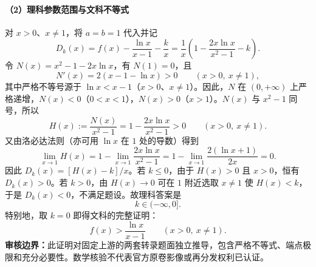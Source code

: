 \documentclass[UTF8,a4paper,10pt]{ctexart}
\begin{document}
\paragraph{（2）理科参数范围与文科不等式} 对 $x>0$、$x\ne1$，将 $a=b=1$ 代入并记
\[
D_k(x)=f(x)-\frac{\ln x}{x-1}-\frac{k}{x}
=\frac1x\left(1-\frac{2x\ln x}{x^2-1}-k\right).
\]
令 $N(x)=x^2-1-2x\ln x$，有 $N(1)=0$，且
\[
N'(x)=2(x-1-\ln x)>0\qquad (x>0,\ x\ne1),
\]
其中严格不等号源于 $\ln x<x-1$（$x>0$、$x\ne1$）。因此，$N$ 在 $(0,+\infty)$ 上严格递增，$N(x)<0$（$0<x<1$），$N(x)>0$（$x>1$）。$N(x)$ 与 $x^2-1$ 同号，所以
\[
H(x):=\frac{N(x)}{x^2-1}
=1-\frac{2x\ln x}{x^2-1}>0\qquad (x>0,\ x\ne1).
\]
又由洛必达法则（亦可用 $\ln x$ 在 $1$ 处的导数）得到
\[
\lim_{x\to1}H(x)=1-\lim_{x\to1}\frac{2x\ln x}{x^2-1}
=1-\lim_{x\to1}\frac{2(\ln x+1)}{2x}=0.
\]
因此 $D_k(x)=[H(x)-k]/x$。若 $k\le0$，由于 $H(x)>0$ 且 $x>0$，恒有 $D_k(x)>0$。若 $k>0$，由 $H(x)\to0$ 可在 $1$ 附近选取 $x\ne1$ 使 $H(x)<k$，于是 $D_k(x)<0$，不满足题设。故理科答案是
\[\boxed{k\in(-\infty,0]}.\]
特别地，取 $k=0$ 即得文科的完整证明：
\[\boxed{\;f(x)>\frac{\ln x}{x-1}\qquad (x>0,\ x\ne1).\;}\]
\medskip
\noindent\textbf{审核边界：}此证明对固定上游的两套转录题面独立推导，包含严格不等式、端点极限和充分必要性。数学核验不代表官方原卷影像或再分发权利已认证。
\end{document}

